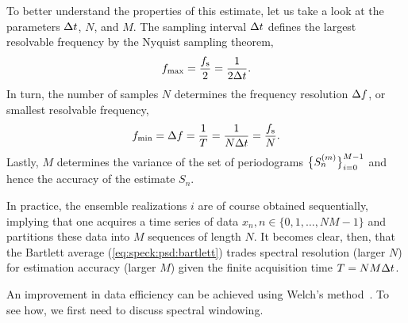 To better understand the properties of this estimate, let us take a look at the parameters $\Delta t$, $N$, and $M$.
The sampling interval $\Delta t$ defines the largest resolvable frequency by the Nyquist sampling theorem,
\begin{align}\label{eq:speck:f_max}
    f_{\mathrm{max}} = \frac{f_{\mathrm{s}}}{2} = \frac{1}{2\Delta t}.
\end{align}
In turn, the number of samples $N$ determines the frequency resolution $\Delta f$, or smallest resolvable frequency,
\begin{align}\label{eq:speck:f_min}
    f_{\mathrm{min}} = \Delta f = \frac{1}{T} = \frac{1}{N\Delta t} = \frac{f_{\mathrm{s}}}{N}.
\end{align}
Lastly, $M$ determines the variance of the set of periodograms $\bigl\lbrace S_n^{(m)}\bigr\rbrace_{i=0}^{M-1}$ and hence the accuracy of the estimate $S_n$.

In practice, the ensemble realizations $i$ are of course obtained sequentially, implying that one acquires a time series of data $x_n, n\in\lbrace0, 1, \dotsc, NM - 1\rbrace$ and partitions these data into $M$ sequences of length $N$.
It becomes clear, then, that the Bartlett average (\cref{eq:speck:psd:bartlett}) trades spectral resolution (larger $N$) for estimation accuracy (larger $M$) given the finite acquisition time $T = NM\Delta t$.

An improvement in data efficiency can be achieved using Welch's method~\cite{Welch1967}.
To see how, we first need to discuss spectral windowing.

